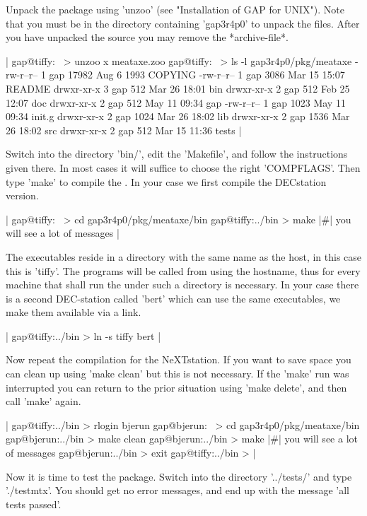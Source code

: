 Unpack the package using 'unzoo'  (see  "Installation of GAP for  UNIX").
Note  that you must  be in the  directory containing 'gap3r4p0' to unpack
the files.  After   you have  unpacked the source   you   may remove  the
*archive-file*.

|    gap@tiffy:~ > unzoo x meataxe.zoo
    gap@tiffy:~ > ls -l gap3r4p0/pkg/meataxe
    -rw-r--r--    1 gap         17982 Aug  6  1993 COPYING
    -rw-r--r--    1 gap          3086 Mar 15 15:07 README
    drwxr-xr-x    3 gap           512 Mar 26 18:01 bin
    drwxr-xr-x    2 gap           512 Feb 25 12:07 doc
    drwxr-xr-x    2 gap           512 May 11 09:34 gap
    -rw-r--r--    1 gap          1023 May 11 09:34 init.g
    drwxr-xr-x    2 gap          1024 Mar 26 18:02 lib
    drwxr-xr-x    2 gap          1536 Mar 26 18:02 src
    drwxr-xr-x    2 gap           512 Mar 15 11:36 tests |

Switch into the directory 'bin/', edit the 'Makefile', and follow the
instructions given there.  In most cases it will suffice to choose the
right 'COMPFLAGS'.  Then type  'make' to compile  the {\MeatAxe}.
In  your case we first compile  the  DECstation version.

|    gap@tiffy:~ > cd gap3r4p0/pkg/meataxe/bin
    gap@tiffy:../bin > make
    |\#| you will see a lot of messages |

The executables reside in a directory with the same name as the host, in
this case this is 'tiffy'.  The programs will be called from {\GAP} using
the hostname, thus for every machine that shall run the {\MeatAxe} under
{\GAP} such a directory is necessary.  In your case there is a second
DEC-station called 'bert' which can use the same executables, we make them
available via a link.

|    gap@tiffy:../bin > ln -s tiffy bert |

Now repeat the compilation  for the NeXTstation.  If you want to save space
you can clean up using 'make clean' but this is not necessary.
If the 'make' run was interrupted you can return to the prior situation
using 'make delete', and then call 'make' again.

|    gap@tiffy:../bin > rlogin bjerun
    gap@bjerun:~ > cd gap3r4p0/pkg/meataxe/bin
    gap@bjerun:../bin > make clean
    gap@bjerun:../bin > make
    |\#| you will see a lot of messages
    gap@bjerun:../bin > exit
    gap@tiffy:../bin > |

Now it is time to test the package.  Switch into the directory '../tests/'
and type './testmtx'.  You should get no error messages, and end up with
the message 'all tests passed'.

